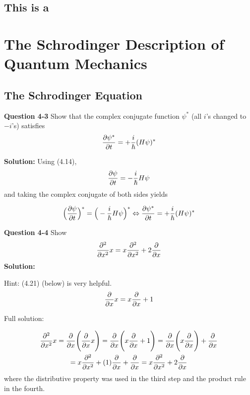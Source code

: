 \documentclass{article}
\begin{document}
\subsection{This is a }


\section{The Schrodinger Description of Quantum Mechanics}

\subsection{The Schrodinger Equation}
\textbf{Question 4-3} Show that the complex conjugate function $\psi^{*}$ (all $i$'s changed to $-i$'s) satisfies 
\begin{equation*}
    \pdv{\psi^{*}}{t} = +\frac{i}{\hbar}(H\psi)^{*}
\end{equation*}

\textbf{Solution:}
Using (4.14), 
\begin{equation*}
    \pdv{\psi}{t} = - \frac{i}{\hbar}H\psi
\end{equation*}
and taking the complex conjugate of both sides yields 

\begin{equation*}
    \Big( \pdv{\psi}{t} \Big)^{*} = \Big( - \frac{i}{\hbar}H\psi \Big)^{*} \Leftrightarrow  \pdv{\psi^{*}}{t} = +\frac{i}{\hbar}(H\psi)^{*}
\end{equation*}

\textbf{Question 4-4} Show 
\begin{equation*}
    \pdv[2]{}{x}x = x\pdv[2]{}{x} + 2 \pdv{}{x} 
\end{equation*}
\textbf{Solution:} 

\noindent Hint: (4.21) (below) is very helpful. 
\begin{equation*}
    \pdv{}{x}x = x\pdv{}{x} + 1
\end{equation*}

\noindent Full solution: 

\begin{multline*}
     \pdv[2]{}{x}x = \pdv{}{x} \Bigg( \pdv{}{x}x \Bigg) = \pdv{}{x} \Bigg( x\pdv{}{x} + 1 \Bigg) = \pdv{}{x} \Bigg( x\pdv{}{x} \Bigg) + \pdv{}{x} \\ = x \pdv[2]{}{x} + (1)\pdv{}{x} + \pdv{}{x} =  x\pdv[2]{}{x} + 2 \pdv{}{x}   
\end{multline*}
where the distributive property was used in the third step and the product rule in the fourth. 
\end{document}

